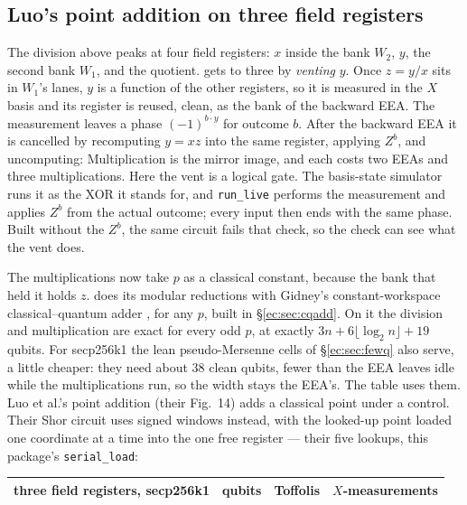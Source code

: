\subsection{Luo's point addition on three field registers}\label{ec:sec:luo3}

The division above peaks at four field registers: $x$ inside the bank $W_2$, $y$, the second bank
$W_1$, and the quotient. \cite{ec:luo26} gets to three by \emph{venting} $y$. Once $z=y/x$ sits in
$W_1$'s lanes, $y$ is a function of the other registers, so it is measured in the $X$ basis and
its register is reused, clean, as the bank of the backward EEA. The measurement leaves a phase
$(-1)^{b\cdot y}$ for outcome $b$. After the backward EEA it is cancelled by recomputing $y=xz$
into the same register, applying $Z^b$, and uncomputing:
Multiplication is the mirror image, and each costs two EEAs and three multiplications. Here the
vent is a logical gate. The basis-state simulator runs it as the XOR it stands for, and
\texttt{run\_live} performs the measurement and applies $Z^b$ from the actual outcome; every input
then ends with the same phase. Built without the $Z^b$, the same circuit fails that check, so the
check can see what the vent does.

The multiplications now take $p$ as a classical constant, because the bank that held it holds $z$.
\cite{ec:luo26} does its modular reductions with Gidney's constant-workspace classical--quantum
adder \cite{ec:gidney25}, for any $p$, built in \S\ref{ec:sec:cqadd}. On it the division and
multiplication are exact for every odd $p$, at exactly $3n+6\lfloor\log_2n\rfloor+19$ qubits. For
secp256k1 the lean pseudo-Mersenne cells of \S\ref{ec:sec:fewq} also serve, a little cheaper: they
need about $38$ clean qubits, fewer than the EEA leaves idle while the multiplications run, so the
width stays the EEA's. The table uses them. Luo et al.'s point addition (their Fig.~14)
adds a classical point under a control. Their Shor circuit uses signed windows instead, with the
looked-up point loaded one coordinate at a time into the one free register --- their five lookups,
this package's \texttt{serial\_load}:

\begin{center}\small
\begin{tabular}{lrrr}
\toprule
three field registers, secp256k1 & qubits & Toffolis & $X$-measurements\\
\midrule
\bottomrule
\end{tabular}
\end{center}

